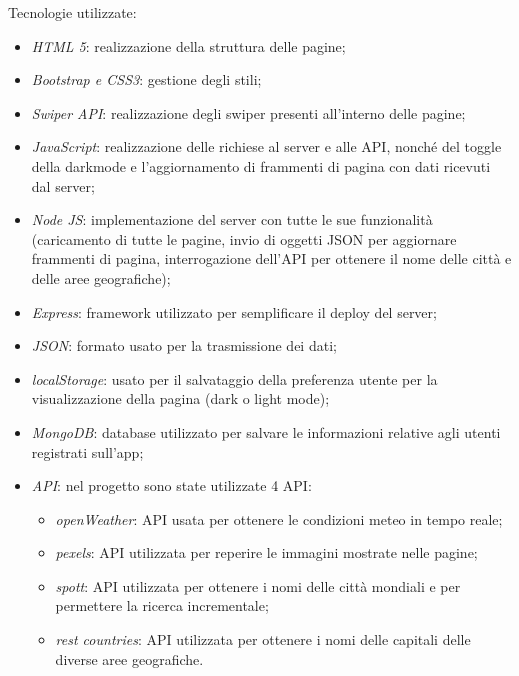 Tecnologie utilizzate:
\begin{itemize}
    \item \emph{HTML 5}: realizzazione della struttura delle pagine;
    \item \emph{Bootstrap e CSS3}: gestione degli stili;
    \item \emph{Swiper API}: realizzazione degli swiper presenti all'interno delle pagine;
    \item \emph{JavaScript}: realizzazione delle richiese al server e alle API, nonché del toggle della darkmode e l'aggiornamento
          di frammenti di pagina con dati ricevuti dal server;
    \item \emph{Node JS}: implementazione del server con tutte le sue funzionalità (caricamento di tutte le pagine,
          invio di oggetti JSON per aggiornare frammenti di pagina, interrogazione dell'API per ottenere il nome delle città e delle
          aree geografiche);
    \item \emph{Express}: framework utilizzato per semplificare il deploy del server;
    \item \emph{JSON}: formato usato per la trasmissione dei dati;
    \item \emph{localStorage}: usato per il salvataggio della preferenza utente per la visualizzazione della pagina (dark o light mode);
    \item \emph{MongoDB}: database utilizzato per salvare le informazioni relative agli utenti registrati sull'app;
    \item \emph{API}: nel progetto sono state utilizzate 4 API:
          \begin{itemize}
              \item \emph{openWeather}: API usata per ottenere le condizioni meteo in tempo reale;
              \item \emph{pexels}: API utilizzata per reperire le immagini mostrate nelle pagine;
              \item \emph{spott}: API utilizzata per ottenere i nomi delle città mondiali e per permettere la ricerca incrementale;
              \item \emph{rest countries}: API utilizzata per ottenere i nomi delle capitali delle diverse aree geografiche.
          \end{itemize}
\end{itemize}